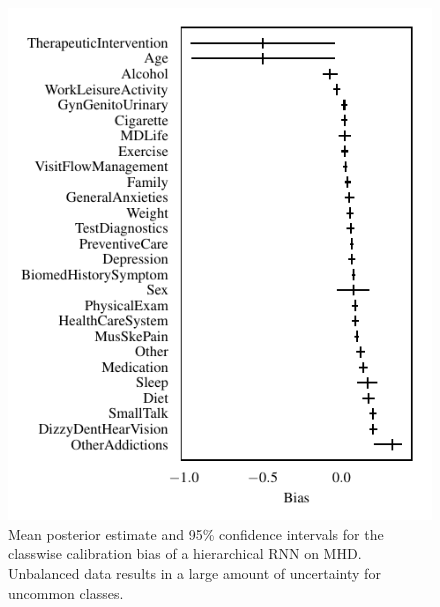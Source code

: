 \documentclass{article}
\begin{document}
\begin{figure}[t]
    \centering
    \includegraphics{figures/mhd_bias.pdf}
    \caption{
        Mean posterior estimate and 95\% confidence intervals for the classwise calibration bias of a hierarchical RNN on MHD.
        Unbalanced data results in a large amount of uncertainty for uncommon classes. %
    }
    \label{fig:mhd_bias}
\end{figure}
\end{document}

